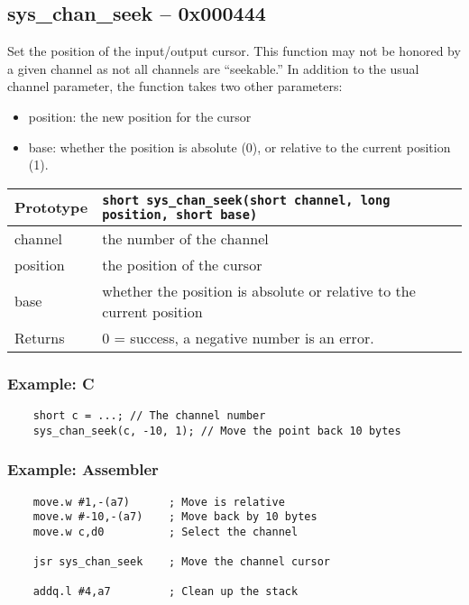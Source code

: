 \subsection*{sys\_chan\_seek -- 0x000444}
Set the position of the input/output cursor. This function may not be honored by a given channel as not all channels are ``seekable.''
In addition to the usual channel parameter, the function takes two other parameters:
\begin{itemize}
\item position: the new position for the cursor
\item base: whether the position is absolute (0), or relative to the current position (1).
\end{itemize}

\bigskip

\begin{tabular}{|l||l|} \hline
Prototype & \lstinline!short sys_chan_seek(short channel, long position, short base)! \\ \hline
channel & the number of the channel \\ \hline
position & the position of the cursor \\ \hline
base & whether the position is absolute or relative to the current position \\ \hline
Returns & 0 = success, a negative number is an error. \\ \hline
\end{tabular}

\subsubsection*{Example: C}
\begin{lstlisting}
    short c = ...; // The channel number
    sys_chan_seek(c, -10, 1); // Move the point back 10 bytes
\end{lstlisting}

\subsubsection*{Example: Assembler}
\begin{verbatim}
    move.w #1,-(a7)      ; Move is relative
    move.w #-10,-(a7)    ; Move back by 10 bytes
    move.w c,d0          ; Select the channel
    
    jsr sys_chan_seek    ; Move the channel cursor

    addq.l #4,a7         ; Clean up the stack
\end{verbatim}

